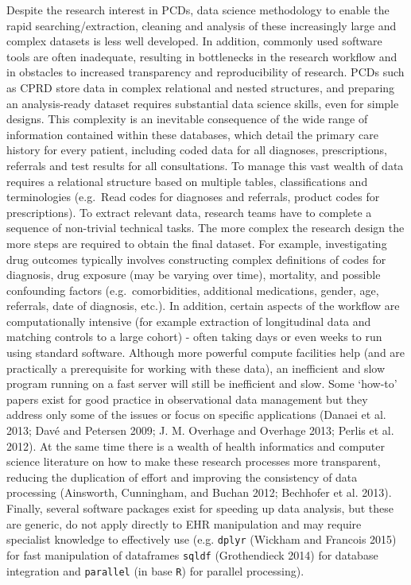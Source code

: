 \documentclass[]{article}
\begin{document}
Despite the research interest in PCDs, data science methodology to
enable the rapid searching/extraction, cleaning and analysis of these
increasingly large and complex datasets is less well developed. In
addition, commonly used software tools are often inadequate, resulting
in bottlenecks in the research workflow and in obstacles to increased
transparency and reproducibility of research. PCDs such as CPRD store
data in complex relational and nested structures, and preparing an
analysis-ready dataset requires substantial data science skills, even
for simple designs. This complexity is an inevitable consequence of the
wide range of information contained within these databases, which detail
the primary care history for every patient, including coded data for all
diagnoses, prescriptions, referrals and test results for all
consultations. To manage this vast wealth of data requires a relational
structure based on multiple tables, classifications and terminologies
(e.g.~Read codes for diagnoses and referrals, product codes for
prescriptions). To extract relevant data, research teams have to
complete a sequence of non-trivial technical tasks. The more complex the
research design the more steps are required to obtain the final dataset.
For example, investigating drug outcomes typically involves constructing
complex definitions of codes for diagnosis, drug exposure (may be
varying over time), mortality, and possible confounding factors
(e.g.~comorbidities, additional medications, gender, age, referrals,
date of diagnosis, etc.). In addition, certain aspects of the workflow
are computationally intensive (for example extraction of longitudinal
data and matching controls to a large cohort) - often taking days or
even weeks to run using standard software. Although more powerful
compute facilities help (and are practically a prerequisite for working
with these data), an inefficient and slow program running on a fast
server will still be inefficient and slow. Some `how-to' papers exist
for good practice in observational data management but they address only
some of the issues or focus on specific applications (Danaei et al.
2013; Davé and Petersen 2009; J. M. Overhage and Overhage 2013; Perlis
et al. 2012). At the same time there is a wealth of health informatics
and computer science literature on how to make these research processes
more transparent, reducing the duplication of effort and improving the
consistency of data processing (Ainsworth, Cunningham, and Buchan 2012;
Bechhofer et al. 2013). Finally, several software packages exist for
speeding up data analysis, but these are generic, do not apply directly
to EHR manipulation and may require specialist knowledge to effectively
use (e.g. \texttt{dplyr} (Wickham and Francois 2015) for fast
manipulation of dataframes \texttt{sqldf} (Grothendieck 2014) for
database integration and \texttt{parallel} (in base \texttt{R}) for
parallel processing).
\end{document}
